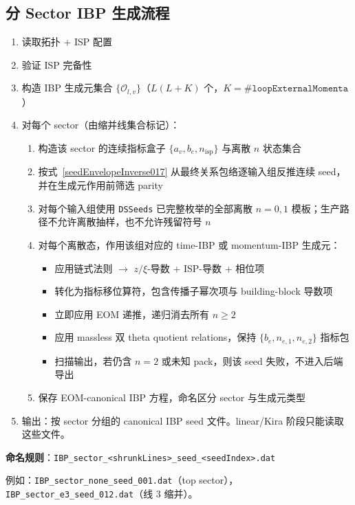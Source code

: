 ﻿\documentclass[a4paper,11pt]{article}
\begin{document}
\subsection{分 Sector IBP 生成流程}

\begin{enumerate}
  \item 读取拓扑 + ISP 配置
  \item 验证 ISP 完备性
  \item 构造 IBP 生成元集合 $\{\mathcal{O}_{l,v}\}$（$L(L+K)$ 个，$K=\#\texttt{loopExternalMomenta}$）
  \item 对每个 sector（由缩并线集合标记）：
  \begin{enumerate}
    \item 构造该 sector 的连续指标盒子 $\{a_v, b_e, n_{\text{isp}}\}$ 与离散 $n$ 状态集合
    \item 按式~\eqref{seedEnvelopeInverse017} 从最终关系包络逐输入组反推连续 seed，并在生成元作用前筛选 parity
    \item 对每个输入组使用 \texttt{DSSeeds} 已完整枚举的全部离散 $n=0,1$ 模板；生产路径不允许离散抽样，也不允许残留符号 $n$
    \item 对每个离散态，作用该组对应的 time-IBP 或 momentum-IBP 生成元：
      \begin{itemize}
        \item 应用链式法则 $\to$ $z/\xi$-导数 + ISP-导数 + 相位项
        \item 转化为指标移位算符，包含传播子幂次项与 building-block 导数项
        \item 立即应用 EOM 递推，递归消去所有 $n\geq 2$
        \item 应用 massless 双 theta quotient relations，保持 $\{b_e,n_{e,1},n_{e,2}\}$ 指标包
        \item 扫描输出，若仍含 $n=2$ 或未知 pack，则该 seed 失败，不进入后端导出
      \end{itemize}
    \item 保存 EOM-canonical IBP 方程，命名区分 sector 与生成元类型
  \end{enumerate}
  \item 输出：按 sector 分组的 canonical IBP seed 文件。linear/Kira 阶段只能读取这些文件。
\end{enumerate}

\textbf{命名规则}：\texttt{IBP\_sector\_<shrunkLines>\_seed\_<seedIndex>.dat}

例如：\texttt{IBP\_sector\_none\_seed\_001.dat}（top sector），\texttt{IBP\_sector\_e3\_seed\_012.dat}（线 3 缩并）。
\end{document}
